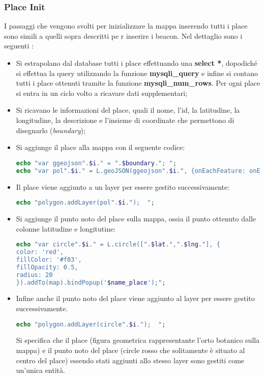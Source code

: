 \subsubsection{Place Init}
I passaggi che vengono svolti per inizializzare la mappa inserendo tutti i place sono simili a quelli sopra descritti pe r inserire i beacon. Nel dettaglio sono i seguenti :
\begin{itemize}
\item Si estrapolano dal database tutti i place effettuando una \textbf{select *}, dopodiché si effettua la query utilizzando la funzione \textbf{mysqli\_query} e infine si contano tutti i place ottenuti tramite la funzione \textbf{mysqli\_num\_rows}. \newline Per ogni place si entra in un ciclo volto a ricavare dati supplementari;
\item Si ricavano le informazioni del place, quali il nome, l'id, la latitudine, la longitudine, la descrizione e l'insieme di coordinate che permettono di disegnarlo (\textit{boundary});
\item Si aggiunge il place alla mappa con il seguente codice:
\begin{lstlisting}[language=PHP]
echo "var ggeojson".$i." = ".$boundary."; ";
echo "var pol".$i." = L.geoJSON(ggeojson".$i.", {onEachFeature: onEachFeature}).addTo(map).bindPopup('$place_descr'); ";
\end{lstlisting}
\item Il place viene aggiunto a un layer per essere gestito successivamente:
\begin{lstlisting}[language=PHP]
echo "polygon.addLayer(pol".$i.");  ";
\end{lstlisting}
\item Si aggiunge il punto noto del place sulla mappa, ossia il punto ottenuto dalle colonne latitudine e longitutine:
\begin{lstlisting}[language=PHP]
echo "var circle".$i." = L.circle([".$lat.",".$lng."], {
color: 'red',
fillColor: '#f03',
fillOpacity: 0.5,
radius: 20
}).addTo(map).bindPopup('$name_place');";
\end{lstlisting}
\item Infine anche il punto noto del place viene aggiunto al layer per essere gestito successivamente.
\begin{lstlisting}[language=PHP]
echo "polygon.addLayer(circle".$i.");  ";
\end{lstlisting}
Si specifica che il place (figura geometrica rappresentante l'orto botanico sulla mappa) e il punto noto del place (circle rosso che solitamente è situato al centro del place) essendo stati aggiunti allo stesso layer sono gestiti come un'unica entità.
\end{itemize}

